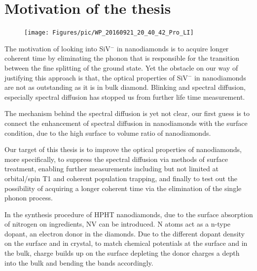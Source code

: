 
\section[Motivation of the thesis, unsolved problem]{Motivation of the thesis}
\FloatBarrier
\begin{figure}[h]
	\centering
	\texttt{[image: Figures/pic/WP\_20160921\_20\_40\_42\_Pro\_LI]}
	\caption{}
	\label{fig:wp20160921204042proli}
\end{figure}
\FloatBarrier
The motivation of looking into SiV$^{-}$ in nanodiamonds is to acquire longer coherent time by eliminating the phonon that is responsible for the transition between the fine splitting of the ground state. Yet the obstacle on our way of justifying this approach is that, the optical properties of SiV$^{-}$ in nanodiamonds are not as outstanding as it is in bulk diamond. Blinking and spectral diffusion, especially spectral diffusion has stopped us from further life time measurement. 

The mechanism behind the spectral diffusion is yet not clear, our first guess is to connect the enhancement of spectral diffusion in nanodiamonds with the surface condition, due to the high surface to volume ratio of nanodiamonds.

Our target of this thesis is to improve the optical properties of nanodiamonds, more specifically, to suppress the spectral diffusion via methods of surface treatment, enabling further measurements including but not limited at orbital/spin T1 and coherent population trapping, and finally to test out the possibility of acquiring a longer coherent time via the elimination of the single phonon process.
  
In the synthesis procedure of HPHT nanodiamonds, due to the surface absorption of nitrogen on ingredients, NV can be introduced. N atoms act as a n-type dopant, an electron donor in the diamonds. Due to the different dopant density on the surface and in crystal, to match chemical potentials at the surface and in the bulk, charge builds up on the surface depleting the donor charges a depth into the bulk and bending the bands accordingly. 

